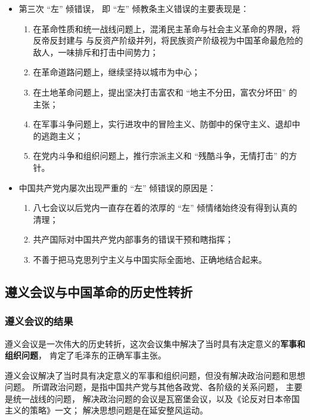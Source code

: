 \documentclass[10pt, UTF8]{ctexbook} %
\begin{document}
\begin{itemize}[itemsep=0pt]
    \item 第三次 “左” 倾错误， 即 “左” 倾教条主义错误的主要表现是：
    \begin{enumerate}[itemsep=0pt, label={(\arabic*)}]
        \item 在革命性质和统一战线问题上，混淆民主革命与社会主义革命的界限，将反帝反封建与
        与反资产阶级并列，将民族资产阶级视为中国革命最危险的敌人，一味排斥和打击中间势力；
        \item 在革命道路问题上，继续坚持以城市为中心；
        \item 在土地革命问题上，提出坚决打击富农和 “地主不分田，富农分坏田” 的主张；
        \item 在军事斗争问题上，实行进攻中的冒险主义、防御中的保守主义、退却中的逃跑主义；
        \item 在党内斗争和组织问题上，推行宗派主义和 “残酷斗争，无情打击” 的方针。
    \end{enumerate}
    \item 中国共产党内屡次出现严重的 “左” 倾错误的原因是：
    \begin{enumerate}[itemsep=0pt, label={(\arabic*)}]
        \item 八七会议以后党内一直存在着的浓厚的 “左” 倾情绪始终没有得到认真的清理；
        \item 共产国际对中国共产党内部事务的错误干预和瞎指挥；
        \item 不善于把马克思列宁主义与中国实际全面地、正确地结合起来。
    \end{enumerate}
\end{itemize}

\subsection{遵义会议与中国革命的历史性转折}

\subsubsection{遵义会议的结果}

遵义会议是一次伟大的历史转折，这次会议集中解决了当时具有决定意义的\textbf{军事和组织问题}，
肯定了毛泽东的正确军事主张。
\begin{remark}
    遵义会议解决了当时具有决定意义的军事和组织问题，但没有解决政治问题和思想问题。
    所谓政治问题，是指中国共产党与其他各政党、各阶级的关系问题，
    主要是统一战线的问题，
    解决政治问题的会议是瓦窑堡会议，以及《论反对日本帝国主义的策略》一文；
    解决思想问题是在延安整风运动。
\end{remark}
\end{document}
